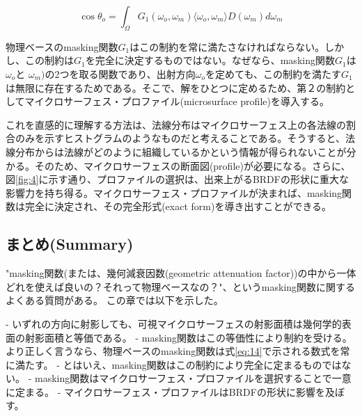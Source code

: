 \documentclass[a4j,xelatex,ja=standard]{bxjsarticle}
\begin{document}
\begin{equation}
    \boxed{
    \cos \theta_o = \int_\Omega G_1(\omega_o, \omega_m) \langle \omega_o, \omega_m \rangle D(\omega_m) d\omega_m
    }
    \label{eq:14}
\end{equation}

物理ベースのmasking関数$G_1$はこの制約を常に満たさなければならない。しかし、この制約は$G_1$を完全に決定するものではない。なぜなら、masking関数$G_1$は$\omega_o$と $\omega_m)$の2つを取る関数であり、出射方向$\omega_o$を定めても、この制約を満たす$G_1$は無限に存在するためである。そこで、解をひとつに定めるため、第２の制約としてマイクロサーフェス・プロファイル(microsurface profile)を導入する。

これを直感的に理解する方法は、法線分布はマイクロサーフェス上の各法線の割合のみを示すヒストグラムのようなものだと考えることである。そうすると、法線分布からは法線がどのように組織しているかという情報が得られないことが分かる。そのため、マイクロサーフェスの断面図(profile)が必要になる。さらに、図\ref{fig:4}に示す通り、プロファイルの選択は、出来上がるBRDFの形状に重大な影響力を持ち得る。マイクロサーフェス・プロファイルが決まれば、masking関数は完全に決定され、その完全形式(exact form)を導き出すことができる。

\subsection{まとめ(Summary)}

"masking関数(または、幾何減衰因数(geometric attenuation factor))の中から一体どれを使えば良いの？それって物理ベースなの？"、というmasking関数に関するよくある質問がある。
この章では以下を示した。

- いずれの方向に射影しても、可視マイクロサーフェスの射影面積は幾何学的表面の射影面積と等価である。
- masking関数はこの等価性により制約を受ける。より正しく言うなら、物理ベースのmasking関数は式\eqref{eq:14}で示される数式を常に満たす。
- とはいえ、masking関数はこの制約により完全に定まるものではない。
- masking関数はマイクロサーフェス・プロファイルを選択することで一意に定まる。
- マイクロサーフェス・プロファイルはBRDFの形状に影響を及ぼす。
\end{document}
